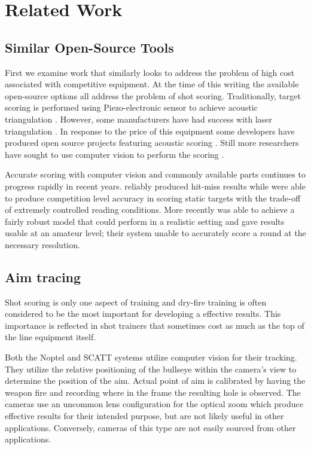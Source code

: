 \documentclass[conference]{IEEEtran}
\begin{document}
\section{Related Work}

\subsection{Similar Open-Source Tools}

First we examine work that similarly looks to address the problem of high cost associated with competitive equipment.
At the time of this writing the available open-source options all address the problem of shot scoring.
Traditionally, target scoring is performed using Piezo-electronic sensor to achieve acoustic triangulation \cite{Anderson2018}.
However, some manufacturers have had success with laser triangulation \cite{SUIS}.
In response to the price of this equipment some developers have produced open source projects featuring acoustic scoring \cite{etarg, freetarget}.
Still more researchers have sought to use computer vision to perform the scoring \cite{Rudzinski2012, Stenhager2021}.

Accurate scoring with computer vision and commonly available parts continues to progress rapidly in recent years.
\cite{Ye2011} reliably produced  hit-miss results while \cite{Rudzinski2012} were able to produce competition level accuracy in scoring static targets with the trade-off of extremely controlled reading conditions.
More recently \cite{Stenhager2021} was able to achieve a fairly robust model that could perform in a realistic setting and gave results usable at an amateur level; their system unable to accurately score a round at the necessary resolution.

\subsection{Aim tracing}

Shot scoring is only one aspect of training and dry-fire training is often 
considered to be the most important for developing a effective results.
\cite{Potter2017}
This importance is reflected in shot trainers that sometimes cost as much as the top of the line equipment itself.
\cite{scatt, noptel}

Both the Noptel and SCATT systems utilize computer vision for their tracking.
They utilize the relative positioning of the bullseye within the camera's view to determine the position of the aim.
Actual point of aim is calibrated by having the weapon fire and recording where in the frame the resulting hole is observed.
The cameras use an uncommon lens configuration for the optical zoom which produce effective results for their intended purpose, but are not likely useful in other applications.
Conversely, cameras of this type are not easily sourced from other applications.
\end{document}
